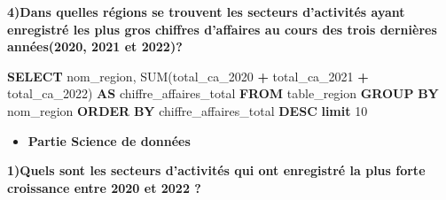 \documentclass[mstat,12pt]{unswthesis}
\newenvironment{Shaded}{\begin{snugshade}}{\end{snugshade}}
\newcommand{\DecValTok}[1]{\textcolor[rgb]{0.00,0.00,0.81}{#1}}
\newcommand{\FunctionTok}[1]{\textcolor[rgb]{0.00,0.00,0.00}{#1}}
\newcommand{\KeywordTok}[1]{\textcolor[rgb]{0.13,0.29,0.53}{\textbf{#1}}}
\newcommand{\NormalTok}[1]{#1}
\newcommand{\OperatorTok}[1]{\textcolor[rgb]{0.81,0.36,0.00}{\textbf{#1}}}
\begin{document}
\bigskip

\textbf{4)Dans quelles régions se trouvent les secteurs d'activités
ayant enregistré les plus gros chiffres d'affaires au cours des trois
dernières années(2020, 2021 et 2022)? }

\begin{Shaded}
\begin{Highlighting}[]
\KeywordTok{SELECT}\NormalTok{ nom\_region, }\FunctionTok{SUM}\NormalTok{(total\_ca\_2020 }\OperatorTok{+}\NormalTok{ total\_ca\_2021 }
\OperatorTok{+}\NormalTok{ total\_ca\_2022) }\KeywordTok{AS}\NormalTok{ chiffre\_affaires\_total}
\KeywordTok{FROM}\NormalTok{ table\_region}
\KeywordTok{GROUP} \KeywordTok{BY}\NormalTok{ nom\_region}
\KeywordTok{ORDER} \KeywordTok{BY}\NormalTok{ chiffre\_affaires\_total }\KeywordTok{DESC} \KeywordTok{limit} \DecValTok{10}
\end{Highlighting}
\end{Shaded}

\bigskip

\begin{itemize}
\tightlist
\item
  \textbf{Partie Science de données}\bigskip
\end{itemize}

\textbf{1)Quels sont les secteurs d'activités qui ont enregistré la plus
forte croissance entre 2020 et 2022 ?}
\end{document}

